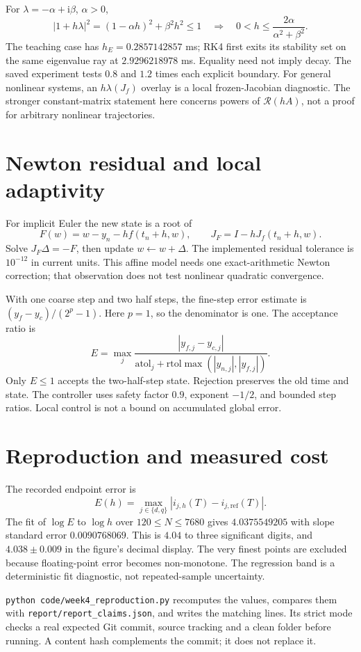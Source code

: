 \documentclass[11pt]{article}
\begin{document}
For $\lambda=-\alpha+\mathrm{i}\beta$, $\alpha>0$,
\[
|1+h\lambda|^2=(1-\alpha h)^2+\beta^2h^2\le1
\quad\Longrightarrow\quad 0<h\le\frac{2\alpha}{\alpha^2+\beta^2}.
\]
The teaching case has $h_E=0.2857142857$ ms; RK4 first exits its stability set
on the same eigenvalue ray at $2.9296218978$ ms. Equality need not imply decay.
The saved experiment tests $0.8$ and $1.2$ times each explicit boundary.
For general nonlinear systems, an $h\lambda(J_f)$ overlay is a local frozen-Jacobian
diagnostic. The stronger constant-matrix statement here concerns powers of
$\mathcal R(hA)$, not a proof for arbitrary nonlinear trajectories.

\section{Newton residual and local adaptivity}
For implicit Euler the new state is a root of
\[
F(w)=w-y_n-hf(t_n+h,w),\qquad J_F=I-hJ_f(t_n+h,w).
\]
Solve $J_F\Delta=-F$, then update $w\leftarrow w+\Delta$. The implemented residual
tolerance is $10^{-12}$ in current units. This affine model needs one exact-arithmetic
Newton correction; that observation does not test nonlinear quadratic convergence.

With one coarse step and two half steps, the fine-step error estimate is
$(y_f-y_c)/(2^p-1)$. Here $p=1$, so the denominator is one. The acceptance ratio is
\[
E=\max_j\frac{|y_{f,j}-y_{c,j}|}
{\mathrm{atol}_j+\mathrm{rtol}\max(|y_{n,j}|,|y_{f,j}|)}.
\]
Only $E\le1$ accepts the two-half-step state. Rejection preserves the old time
and state. The controller uses safety factor $0.9$, exponent $-1/2$, and bounded
step ratios. Local control is not a bound on accumulated global error.

\newpage
\section{Reproduction and measured cost}
The recorded endpoint error is
\[
E(h)=\max_{j\in\{d,q\}}|i_{j,h}(T)-i_{j,\mathrm{ref}}(T)|.
\]
The fit of $\log E$ to $\log h$ over $120\le N\le7680$ gives
$4.0375549205$ with slope standard error $0.0090768069$. This is $4.04$ to three
significant digits, and $4.038\pm0.009$ in the figure's decimal display.
The very finest points are excluded because floating-point error becomes non-monotone.
The regression band is a deterministic fit diagnostic, not repeated-sample uncertainty.

\texttt{python code/week4\_reproduction.py} recomputes the values, compares them
with \texttt{report/report\_claims.json}, and writes the matching lines.
Its strict mode checks a real expected Git commit, source tracking and a clean
folder before running. A content hash complements the commit; it does not replace it.
\end{document}
